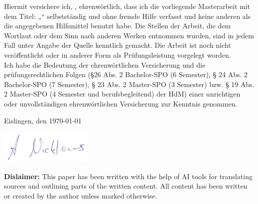 \documentclass[a4paper, fontsize=11pt]{article}
\makeatletter
\let\Title\@title
\let\Author\@author
\makeatother
\begin{document}
	Hiermit versichere ich, \Author, ehrenwörtlich, dass ich die
	vorliegende Masterarbeit mit dem Titel: „\Title“ selbstständig und ohne fremde Hilfe verfasst und keine
	anderen als die angegebenen Hilfsmittel benutzt habe. Die Stellen der Arbeit, die dem
	Wortlaut oder dem Sinn nach anderen Werken entnommen wurden, sind in jedem Fall
	unter Angabe der Quelle kenntlich gemacht. Die Arbeit ist noch nicht veröffentlicht oder
	in anderer Form als Prüfungsleistung vorgelegt worden.\\
	
	Ich habe die Bedeutung der ehrenwörtlichen Versicherung und die prüfungsrechtlichen
	Folgen (§26 Abs. 2 Bachelor-SPO (6 Semester), § 24 Abs. 2 Bachelor-SPO (7 Semester), §
	23 Abs. 2 Master-SPO (3 Semester) bzw. § 19 Abs. 2 Master-SPO (4 Semester und
	berufsbegleitend) der HdM) einer unrichtigen oder unvollständigen ehrenwörtlichen
	Versicherung zur Kenntnis genommen.
	\vspace{30px}
	
	Eislingen, den \today
	\vspace{20px}
	
	\includegraphics[height=60px]{img/unterschrift.png}
	\vspace{10px}
	
	\Author

\pagebreak


\begin{abstract}
  
\end{abstract}

\vfill

\noindent\textbf{Dislaimer:} This paper has been written with the help of AI tools for translating sources and outlining parts of the written content.
All content has been written or created by the author unless marked otherwise.

\pagebreak

\tableofcontents
\end{document}

